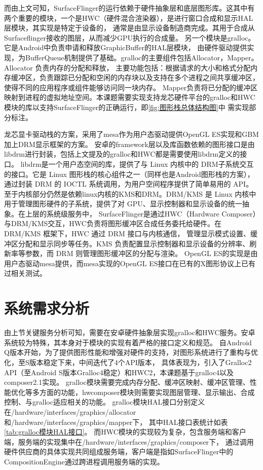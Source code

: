 而由上文可知，SurfaceFlinger的运行依赖于硬件抽象层和底层图形库。这其中有两个重要的模块，一个是HWC（硬件混合渲染器），是进行窗口合成和显示HAL层模块，其实现是特定于设备的，
通常是由显示设备制造商完成。其用于合成从Surfaceflinger接收的图层，从而减少GPU执行的合成量。
另一个模块是gralloc。它是Android中负责申请和释放GraphicBuffer的HAL层模块，
由硬件驱动提供实现，为BufferQueue机制提供了基础。gralloc的主要组件包括Allocator，Mapper。Allocator 负责内存的分配和释放，
主要功能包括：根据请求的大小和格式分配内存缓冲区，负责跟踪已分配和空闲的内存块以及支持在多个进程之间共享缓冲区，使得不同的应用程序或组件能够访问同一块内存。
Mapper负责将已分配的缓冲区映射到进程的虚拟地址空间。本课题需要实现支持龙芯硬件平台的gralloc和HWC模块的库以支持SurfaceFlinger的正确运行，即\ref{fig:图形栈总体结构图}中
需实现部分标注。

龙芯显卡驱动栈的方案，采用了mesa作为用户态驱动提供OpenGL ES实现和GBM加上DRM显示框架的方案。
安卓的framework层以及库函数依赖的图形接口是由libdrm进行封装，包括上文提及的gralloc和HWC都是需要使用libdrm定义的接口。
libdrm是一个用户态空间的库，提供了与 Linux 内核中的 DRM子系统交互的接口。它是 Linux 图形栈的核心组件之一（同样也是Android图形栈的方案），
通过封装 DRM 的 IOCTL 系统调用，为用户空间程序提供了简单易用的 API。
至于内核部分仍然是依赖linux内核的KMS和DRM。DRM/KMS 是 Linux 内核中用于管理图形硬件的子系统，提供了对 GPU、显示控制器和显示设备的统一抽象。在上层的系统级服务中，
SurfaceFlinger是通过HWC（Hardware Composer）与DRM/KMS交互，HWC负责将图形缓冲区合成任务委托给硬件。在 DRM/KMS 框架下，HWC 通过 DRM 接口与内核通信，
管理显示模式设置、缓冲区分配和显示同步等任务。KMS 负责配置显示控制器和显示设备的分辨率、刷新率等参数，而 DRM 则管理图形缓冲区的分配与渲染。
OpenGL ES的实现是由用户态驱动mesa提供，而mesa实现的OpenGL ES接口在已有的X图形协议上已有过相关测试。


\section{系统需求分析}

由上节关键服务分析可知，需要在安卓硬件抽象层实现gralloc和HWC服务。安卓系统较为特殊，其本身对于模块的实现有着严格的接口定义和规范。
自Android Q版本开始，为了提供图形性能和增强对硬件的支持，对图形系统进行了重构与优化，至S版本稳定下来，中间迭代了4个API版本，
具体表现为，引入了Gralloc2 API（至Android S版本Gralloc4稳定）和HWC2，本课题基于gralloc4以及composer2.1实现。
gralloc模块需要完成内存分配、缓冲区映射、缓冲区管理、性能优化等多方面的功能，hwcomposer模块则需要实现图层管理、显示输出、合成控制、与gralloc适应相关的功能。
gralloc模块HAL接口分别定义在/hardware/interfaces/graphics/allocator和/hardware/interfaces/graphics/mapper下，
其中HAL接口表统计如表\ref{tab:gralloc模块HAL接口}。
而HWC模块的实现较为复杂，包含服务端和客户端，服务端的实现集中在/hardware/interfaces/graphics/composer下，
通过调用硬件供应商的具体实现共同组成服务端，客户端是指如SurfaceFlinger中的CompositionEngine通过跨进程调用服务端的实现。

